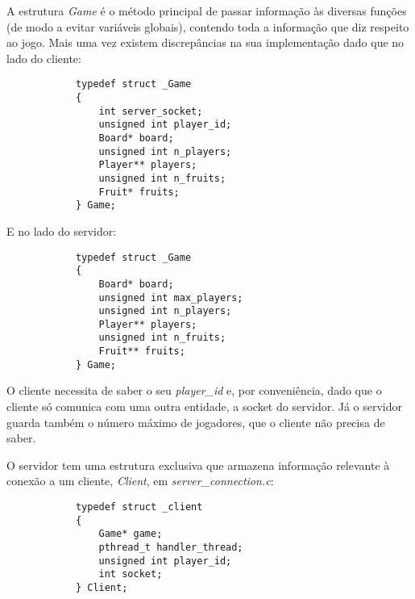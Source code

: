 \documentclass[a4paper]{report}
\begin{document}
        \par A estrutura \textit{Game} é o método principal de passar informação às diversas funções (de modo a evitar variáveis globais), contendo toda a informação que diz respeito ao jogo. Mais uma vez existem discrepâncias na sua implementação dado que no lado do cliente:
        \begin{lstlisting}
            typedef struct _Game
            {
                int server_socket;
                unsigned int player_id;
                Board* board;
                unsigned int n_players;
                Player** players;
                unsigned int n_fruits;
                Fruit* fruits;
            } Game;
        \end{lstlisting}
        \par E no lado do servidor:
        \begin{lstlisting}
            typedef struct _Game
            {
                Board* board;
                unsigned int max_players;
                unsigned int n_players;
                Player** players;
                unsigned int n_fruits;
                Fruit** fruits;
            } Game;
        \end{lstlisting}
        \par O cliente necessita de saber o seu \textit{player\_id} e, por conveniência, dado que o cliente só comunica com uma outra entidade, a socket do servidor. Já o servidor guarda também o número máximo de jogadores, que o cliente não precisa de saber.

        \par O servidor tem uma estrutura exclusiva que armazena informação relevante à conexão a um cliente, \textit{Client}, em \textit{server\_connection.c}:
        \begin{lstlisting}
            typedef struct _client
            {
                Game* game;
                pthread_t handler_thread;
                unsigned int player_id;
                int socket;
            } Client;
        \end{lstlisting}
\end{document}
